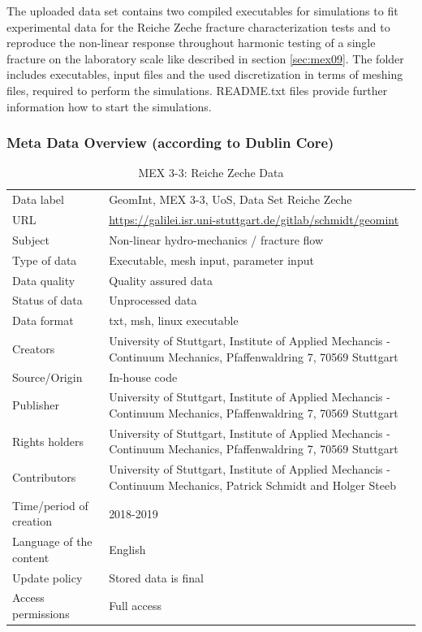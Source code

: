 The uploaded data set contains two compiled executables for simulations to fit experimental data for the Reiche Zeche fracture characterization tests and to reproduce the non-linear response throughout harmonic testing of a single fracture on the laboratory scale like described in section \ref{sec:mex09}. The folder includes executables, input files and the used discretization in terms of meshing files, required to perform the simulations. README.txt files provide further information how to start the simulations.

\clearpage
\subsubsection*{Meta Data Overview (according to Dublin Core)}

\begin{table}[!ht]
\caption{MEX 3-3: Reiche Zeche Data}
\label{tab:dms-mex3-3}
\small
\begin{tabular}{R{3cm}|L{7cm}}
\hline
%
Data label & GeomInt, MEX 3-3, UoS, Data Set Reiche Zeche \\
URL &  \url{https://galilei.isr.uni-stuttgart.de/gitlab/schmidt/geomint} \\
Subject  &  Non-linear hydro-mechanics / fracture flow\\
Type of data  &  Executable, mesh input, parameter input\\
Data quality  &  Quality assured data \\
Status of data  &  Unprocessed data\\
Data format  & txt, msh, linux executable\\
Creators  &  University of Stuttgart, Institute of Applied Mechancis - Continuum Mechanics, Pfaffenwaldring 7, 70569 Stuttgart\\
Source/Origin & In-house code \\
Publisher  &  University of Stuttgart, Institute of Applied Mechancis - Continuum Mechanics, Pfaffenwaldring 7, 70569 Stuttgart \\
Rights holders & University of Stuttgart, Institute of Applied Mechancis - Continuum Mechanics, Pfaffenwaldring 7, 70569 Stuttgart \\
Contributors &  University of Stuttgart, Institute of Applied Mechancis - Continuum Mechanics, Patrick Schmidt and Holger Steeb\\
Time/period of creation &  2018-2019\\
Language of the content &  English\\
Update policy &  Stored data is final\\
Access permissions &  Full access\\
%
\hline
\end{tabular}
\end{table}